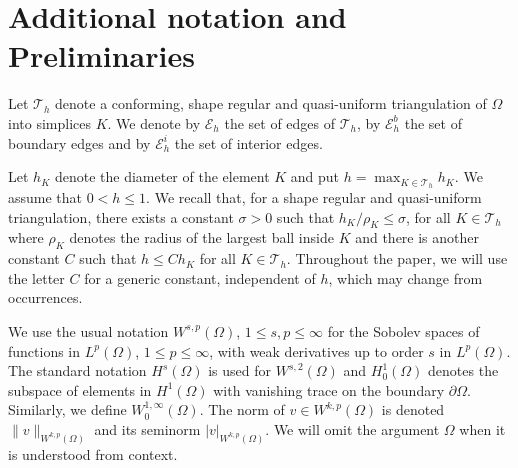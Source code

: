 \documentclass[12pt]{amsart}
\numberwithin{equation}{section}
\begin{document}
\section{Additional notation and Preliminaries}

Let $\mathcal{T}_h$ denote a conforming, shape regular and quasi-uniform triangulation of $\Omega$ into simplices $K$. We
denote by $\mathcal{E}_h$ the set of edges of $\mathcal{T}_h$, by $\mathcal{E}^b_h$ the set of boundary edges and by $\mathcal{E}^i_h$ the set of interior edges. 

Let $h_K$ denote the diameter of the element $K$ and put $h=\max_{K \in \mathcal{T}_h} h_K$. We assume that $0< h \leq 1$. We recall that, for a shape regular and quasi-uniform triangulation, there exists a constant $\sigma >0$ such that $h_K/\rho_K \leq \sigma$, for all $K \in \mathcal{T}_h$ where $\rho_K$ denotes the radius of the largest ball inside $K$ and there is another constant $C$ such that $h \leq C h_K$ for all $K \in \mathcal{T}_h$. Throughout the paper, we will use the letter $C$ for a generic constant, independent of $h$, which may change from occurrences.


We use the usual notation $W^{s,p}(\Omega)$, $1 \leq s, p \leq \infty$ for the Sobolev spaces of functions in $L^{p}(\Omega)$, $1 \leq p \leq \infty$, with weak derivatives up to order $s$ in $L^{p}(\Omega)$. The standard notation $H^s(\Omega)$ is used for $W^{s,2}(\Omega)$ and $H^{1}_{0}(\Omega)$ denotes the subspace of elements in $H^1(\Omega)$ with vanishing trace on the boundary $\partial \Omega$. Similarly, we define $W^{1,\infty}_{0}(\Omega)$. 
The norm of $v \in W^{k,p}(\Omega)$ is denoted $\|v\|_{W^{k,p}(\Omega)}$ and its seminorm $|v|_{W^{k,p}(\Omega)}$.
We will omit the argument $\Omega$ when it is understood from context. 
\end{document}
